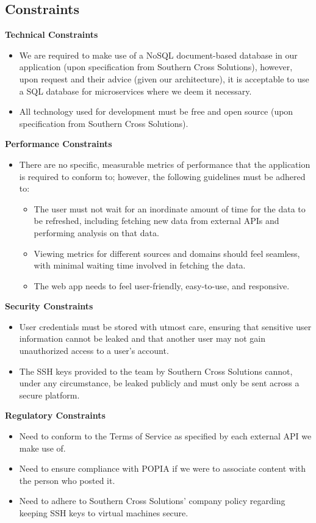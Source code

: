 \documentclass[12pt]{article}
\begin{document}
\subsection{Constraints}

\textbf{Technical Constraints}
\begin{itemize}
  \item We are required to make use of a NoSQL document-based database in our application (upon specification from Southern Cross Solutions), however, upon request and their advice (given our architecture), it is acceptable to use a SQL database for microservices where we deem it necessary.
  \item All technology used for development must be free and open source (upon specification from Southern Cross Solutions).
\end{itemize}

\textbf{Performance Constraints}
\begin{itemize}
  \item There are no specific, measurable metrics of performance that the application is required to conform to; however, the following guidelines must be adhered to:
    \begin{itemize}
      \item The user must not wait for an inordinate amount of time for the data to be refreshed, including fetching new data from external APIs and performing analysis on that data.
      \item Viewing metrics for different sources and domains should feel seamless, with minimal waiting time involved in fetching the data.
      \item The web app needs to feel user-friendly, easy-to-use, and responsive.
    \end{itemize}
\end{itemize}

\textbf{Security Constraints}
\begin{itemize}
  \item User credentials must be stored with utmost care, ensuring that sensitive user information cannot be leaked and that another user may not gain unauthorized access to a user's account.
  \item The SSH keys provided to the team by Southern Cross Solutions cannot, under any circumstance, be leaked publicly and must only be sent across a secure platform.
\end{itemize}

\textbf{Regulatory Constraints}
\begin{itemize}
  \item Need to conform to the Terms of Service as specified by each external API we make use of.
  \item Need to ensure compliance with POPIA if we were to associate content with the person who posted it.
  \item Need to adhere to Southern Cross Solutions' company policy regarding keeping SSH keys to virtual machines secure.
\end{itemize}
\end{document}
